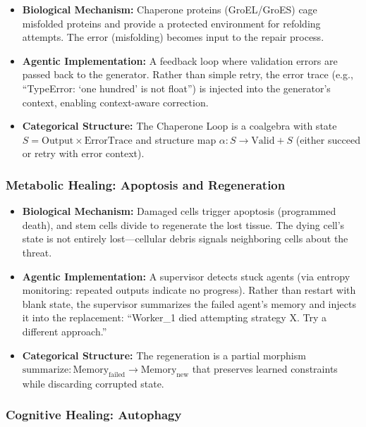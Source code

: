 \begin{itemize}[leftmargin=*]
\item \textbf{Biological Mechanism:} Chaperone proteins (GroEL/GroES) cage misfolded proteins and
provide a protected environment for refolding attempts. The error (misfolding) becomes input to the
repair process.
\item \textbf{Agentic Implementation:} A feedback loop where validation errors are passed back to
the generator. Rather than simple retry, the error trace (e.g., ``TypeError: `one hundred' is not float'')
is injected into the generator's context, enabling context-aware correction.
\item \textbf{Categorical Structure:} The Chaperone Loop is a coalgebra with state
$S = \text{Output} \times \text{ErrorTrace}$ and structure map
$\alpha: S \to \text{Valid} + S$ (either succeed or retry with error context).
\end{itemize}

\subsubsection{Metabolic Healing: Apoptosis and Regeneration}

\begin{itemize}[leftmargin=*]
\item \textbf{Biological Mechanism:} Damaged cells trigger apoptosis (programmed death), and stem
cells divide to regenerate the lost tissue. The dying cell's state is not entirely lost---cellular
debris signals neighboring cells about the threat.
\item \textbf{Agentic Implementation:} A supervisor detects stuck agents (via entropy monitoring:
repeated outputs indicate no progress). Rather than restart with blank state, the supervisor
summarizes the failed agent's memory and injects it into the replacement: ``Worker\_1 died
attempting strategy X. Try a different approach.''
\item \textbf{Categorical Structure:} The regeneration is a partial morphism
$\text{summarize}: \text{Memory}_{\text{failed}} \to \text{Memory}_{\text{new}}$ that preserves
learned constraints while discarding corrupted state.
\end{itemize}

\subsubsection{Cognitive Healing: Autophagy}

